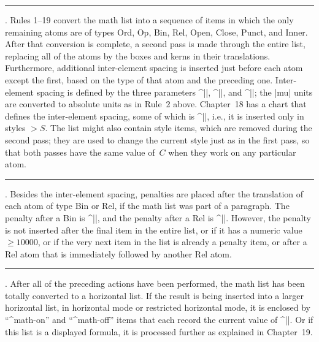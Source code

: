 \medbreak \rule 20. Rules 1--19 convert the math list into a sequence of
items in which the only remaining atoms are of types Ord, Op, Bin, Rel,
Open, Close, Punct, and Inner. After that conversion is complete, a second pass
is made through the entire list, replacing all of the atoms by the boxes
and kerns in their translations. Furthermore, additional inter-element
spacing is inserted just before each atom except the first, based on the
type of that atom and the preceding one.  Inter-element spacing is defined
by the three parameters ^|\thinmuskip|, ^|\medmuskip|, and
^|\thickmuskip|; the |mu| units are converted to absolute units as in
Rule~2 above.  Chapter~18 has a chart that defines the inter-element
spacing, some of which is ^|\nonscript|, i.e., it is inserted only in
styles $>S$.  The list might also contain style items, which are removed
during the second pass; they are used to change the current style just as
in the first pass, so that both passes have the same value of~$C$ when
they work on any particular atom.

\rule 21. Besides the inter-element spacing, penalties are placed after
the translation of each atom of type Bin or Rel, if the math list was part
of a paragraph.  The penalty after a Bin is ^|\binoppenalty|, and the
penalty after a Rel is ^|\relpenalty|. However, the penalty is not
inserted after the final item in the entire list, or if it has a numeric
value~$\ge10000$, or if the very next item in the list is already a
penalty item, or after a Rel atom that is immediately followed by another
Rel atom.

\rule 22. After all of the preceding actions have been performed, the math
list has been totally converted to a horizontal list. If the result is
being inserted into a larger horizontal list, in horizontal mode or
restricted horizontal mode, it is enclosed by ``^{math-on}'' and
``^{math-off}'' items that each record the current value of\/
^|\mathsurround|.  Or if this list is a displayed formula, it
is processed further as explained in Chapter~19.

